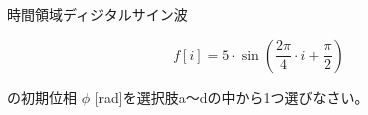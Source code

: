 時間領域ディジタルサイン波 

\[
f[i] = 5 \cdot \sin \left ( \frac{2 \pi}{4}  \cdot i + \frac{\pi}{2} \right )
\]

\noindent の初期位相 $\phi$ [rad]を選択肢a〜dの中から1つ選びなさい。
